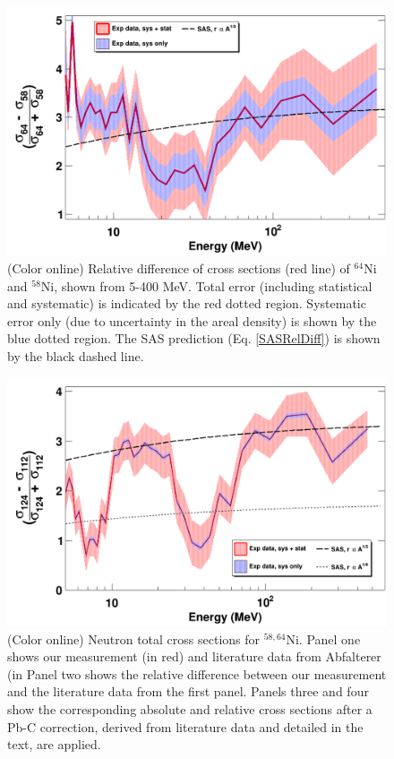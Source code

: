 \documentclass[twocolumn,secnumarabic,amssymb, nobibnotes, aps, prl,
superscriptaddress, nobalancelastpage]{revtex4}
\begin{document}
\begin{figure}
    \includegraphics[scale=0.35]{figures/relativeDiff_Ni64Ni58.png}
    \caption{(Color online) Relative difference of cross sections (red line) of
        $^{\text{64}}$Ni and $^{\text{58}}$Ni, shown from 5-400
        MeV. Total error
        (including statistical and systematic) is indicated by the red
        dotted region. Systematic error only (due to uncertainty in the areal
        density) is shown by the blue dotted region. The SAS prediction (Eq.
        \ref{SASRelDiff}) is shown by the black dashed line.
    }
    \label{IsotopicDifferenceNi}
\end{figure}

\begin{figure}
    \includegraphics[scale=0.35]{figures/relativeDiff_Sn124Sn112.png}
    \caption{(Color online) Neutron total cross sections for $^{58,64}$Ni.
     Panel one shows our measurement (in red) and literature data from
     Abfalterer (in %
     Panel two shows the relative difference between our 
     measurement and the literature data from the first panel. Panels three and
     four show the corresponding absolute and relative cross sections after a
     Pb-C correction, derived from literature data and detailed in the text,
     are applied.
    }
    \label{IsotopicDifferenceSn}
\end{figure}
\end{document}
